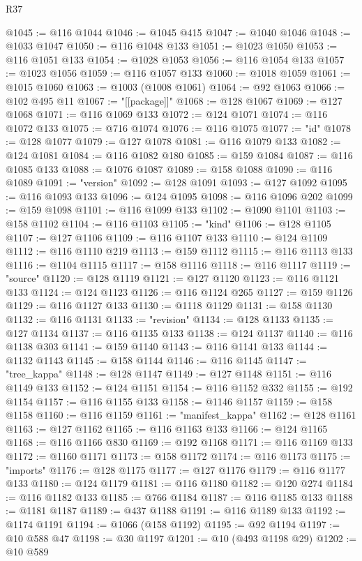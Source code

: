 \begin{lexlean}{R37}
\begin{coremodule}
@1045 := @116 @1044
@1046 := @1045 @415
@1047 := @1040 @1046
@1048 := @1033 @1047
@1050 := @116 @1048 @133
@1051 := @1023 @1050
@1053 := @116 @1051 @133
@1054 := @1028 @1053
@1056 := @116 @1054 @133
@1057 := @1023 @1056
@1059 := @116 @1057 @133
@1060 := @1018 @1059
@1061 := @1015 @1060
@1063 := @1003 (@1008 @1061)
@1064 := @92 @1063
@1066 := @102 @495 @11
@1067 := "[[package]]"
@1068 := @128 @1067
@1069 := @127 @1068
@1071 := @116 @1069 @133
@1072 := @124 @1071
@1074 := @116 @1072 @133
@1075 := @716 @1074
@1076 := @116 @1075
@1077 := "id"
@1078 := @128 @1077
@1079 := @127 @1078
@1081 := @116 @1079 @133
@1082 := @124 @1081
@1084 := @116 @1082 @180
@1085 := @159 @1084
@1087 := @116 @1085 @133
@1088 := @1076 @1087
@1089 := @158 @1088
@1090 := @116 @1089
@1091 := "version"
@1092 := @128 @1091
@1093 := @127 @1092
@1095 := @116 @1093 @133
@1096 := @124 @1095
@1098 := @116 @1096 @202
@1099 := @159 @1098
@1101 := @116 @1099 @133
@1102 := @1090 @1101
@1103 := @158 @1102
@1104 := @116 @1103
@1105 := "kind"
@1106 := @128 @1105
@1107 := @127 @1106
@1109 := @116 @1107 @133
@1110 := @124 @1109
@1112 := @116 @1110 @219
@1113 := @159 @1112
@1115 := @116 @1113 @133
@1116 := @1104 @1115
@1117 := @158 @1116
@1118 := @116 @1117
@1119 := "source"
@1120 := @128 @1119
@1121 := @127 @1120
@1123 := @116 @1121 @133
@1124 := @124 @1123
@1126 := @116 @1124 @265
@1127 := @159 @1126
@1129 := @116 @1127 @133
@1130 := @1118 @1129
@1131 := @158 @1130
@1132 := @116 @1131
@1133 := "revision"
@1134 := @128 @1133
@1135 := @127 @1134
@1137 := @116 @1135 @133
@1138 := @124 @1137
@1140 := @116 @1138 @303
@1141 := @159 @1140
@1143 := @116 @1141 @133
@1144 := @1132 @1143
@1145 := @158 @1144
@1146 := @116 @1145
@1147 := "tree_kappa"
@1148 := @128 @1147
@1149 := @127 @1148
@1151 := @116 @1149 @133
@1152 := @124 @1151
@1154 := @116 @1152 @332
@1155 := @192 @1154
@1157 := @116 @1155 @133
@1158 := @1146 @1157
@1159 := @158 @1158
@1160 := @116 @1159
@1161 := "manifest_kappa"
@1162 := @128 @1161
@1163 := @127 @1162
@1165 := @116 @1163 @133
@1166 := @124 @1165
@1168 := @116 @1166 @830
@1169 := @192 @1168
@1171 := @116 @1169 @133
@1172 := @1160 @1171
@1173 := @158 @1172
@1174 := @116 @1173
@1175 := "imports"
@1176 := @128 @1175
@1177 := @127 @1176
@1179 := @116 @1177 @133
@1180 := @124 @1179
@1181 := @116 @1180
@1182 := @120 @274
@1184 := @116 @1182 @133
@1185 := @766 @1184
@1187 := @116 @1185 @133
@1188 := @1181 @1187
@1189 := @437 @1188
@1191 := @116 @1189 @133
@1192 := @1174 @1191
@1194 := @1066 (@158 @1192)
@1195 := @92 @1194
@1197 := @10 @588 @47
@1198 := @30 @1197
@1201 := @10 (@493 @1198 @29)
@1202 := @10 @589

\end{coremodule}
\end{lexlean}
